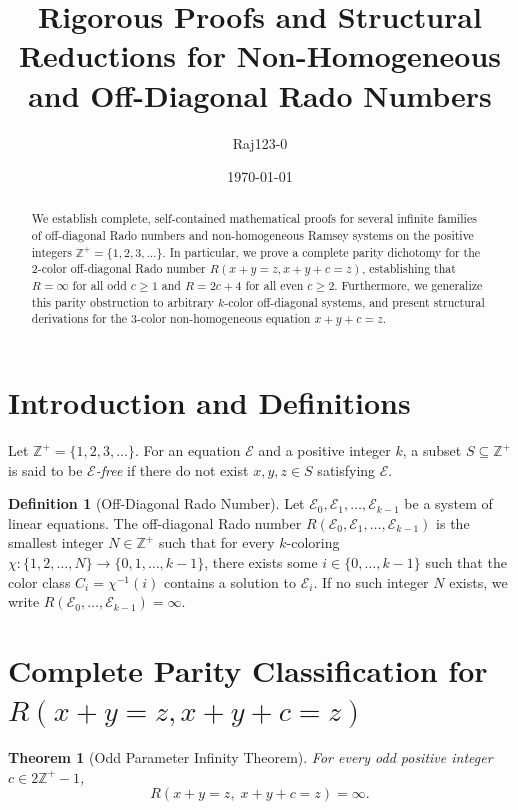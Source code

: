 \documentclass[11pt]{article}
\title{\textbf{Rigorous Proofs and Structural Reductions for Non-Homogeneous and Off-Diagonal Rado Numbers}}
\author{Raj123-0}
\date{\today}
\newtheorem{theorem}{Theorem}
\theoremstyle{definition}
\newtheorem{definition}{Definition}
\begin{document}
\maketitle

\begin{abstract}
We establish complete, self-contained mathematical proofs for several infinite families of off-diagonal Rado numbers and non-homogeneous Ramsey systems on the positive integers $\mathbb{Z}^+ = \{1, 2, 3, \dots\}$. In particular, we prove a complete parity dichotomy for the 2-color off-diagonal Rado number $R(x+y=z, x+y+c=z)$, establishing that $R = \infty$ for all odd $c \ge 1$ and $R = 2c + 4$ for all even $c \ge 2$. Furthermore, we generalize this parity obstruction to arbitrary $k$-color off-diagonal systems, and present structural derivations for the 3-color non-homogeneous equation $x + y + c = z$.
\end{abstract}

\section{Introduction and Definitions}

Let $\mathbb{Z}^+ = \{1, 2, 3, \dots\}$. For an equation $\mathcal{E}$ and a positive integer $k$, a subset $S \subseteq \mathbb{Z}^+$ is said to be \emph{$\mathcal{E}$-free} if there do not exist $x, y, z \in S$ satisfying $\mathcal{E}$.

\begin{definition}[Off-Diagonal Rado Number]
Let $\mathcal{E}_0, \mathcal{E}_1, \dots, \mathcal{E}_{k-1}$ be a system of linear equations. The off-diagonal Rado number $R(\mathcal{E}_0, \mathcal{E}_1, \dots, \mathcal{E}_{k-1})$ is the smallest integer $N \in \mathbb{Z}^+$ such that for every $k$-coloring $\chi: \{1, 2, \dots, N\} \to \{0, 1, \dots, k-1\}$, there exists some $i \in \{0, \dots, k-1\}$ such that the color class $C_i = \chi^{-1}(i)$ contains a solution to $\mathcal{E}_i$. If no such integer $N$ exists, we write $R(\mathcal{E}_0, \dots, \mathcal{E}_{k-1}) = \infty$.
\end{definition}

\section{Complete Parity Classification for $R(x+y=z, x+y+c=z)$}

\begin{theorem}[Odd Parameter Infinity Theorem]\label{thm:odd_inf}
For every odd positive integer $c \in 2\mathbb{Z}^+ - 1$,
\begin{equation}
    R(x+y=z, \; x+y+c=z) = \infty.
\end{equation}
\end{theorem}
\end{document}
